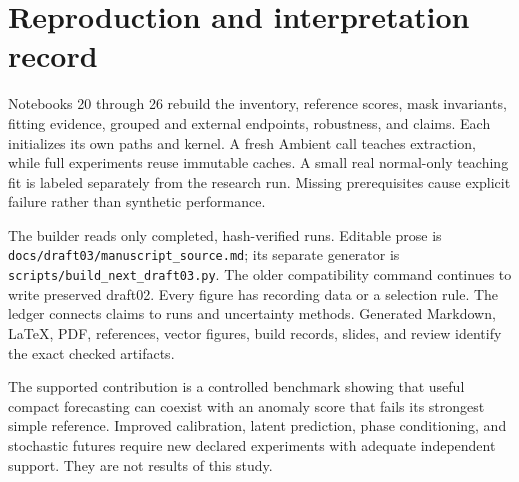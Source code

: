 \documentclass[letterpaper]{article}
\begin{document}
\section{Reproduction and interpretation record}

Notebooks 20 through 26 rebuild the inventory, reference scores, mask invariants, fitting evidence, grouped and external endpoints, robustness, and claims. Each initializes its own paths and kernel. A fresh Ambient call teaches extraction, while full experiments reuse immutable caches. A small real normal-only teaching fit is labeled separately from the research run. Missing prerequisites cause explicit failure rather than synthetic performance.

The builder reads only completed, hash-verified runs. Editable prose is \texttt{docs/draft03/manuscript\_source.md}; its separate generator is \texttt{scripts/build\_next\_draft03.py}. The older compatibility command continues to write preserved draft02. Every figure has recording data or a selection rule. The ledger connects claims to runs and uncertainty methods. Generated Markdown, LaTeX, PDF, references, vector figures, build records, slides, and review identify the exact checked artifacts.

The supported contribution is a controlled benchmark showing that useful compact forecasting can coexist with an anomaly score that fails its strongest simple reference. Improved calibration, latent prediction, phase conditioning, and stochastic futures require new declared experiments with adequate independent support. They are not results of this study.
\end{document}
